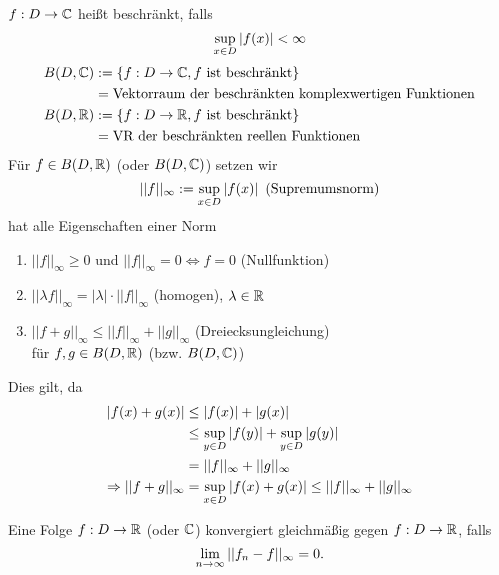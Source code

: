\documentclass[../ana1.tex]{subfiles}
\begin{document}
\begin{defi}
    \( f: D \rightarrow \mathbb{C} \) heißt beschränkt, falls 
    \[ \underset{x\in D}{\sup} \left|f(x)\right| < \infty \]
    \begin{align*}
        B(D, \mathbb{C}) &:= \{ f: D \rightarrow \mathbb{C}, 
        f \text{ ist beschränkt} \} \\
        &= \text{Vektorraum der beschränkten 
        komplexwertigen Funktionen} \\
        B(D, \mathbb{R}) &:= \{ f: D \rightarrow \mathbb{R}, 
        f \text{ ist beschränkt} \} \\
        &= \text{VR der beschränkten reellen Funktionen}
    \end{align*}
    Für \( f\in B(D,\mathbb{R}) \) (oder \( B(D,\mathbb{C}) \)) setzen wir 
    \[ ||f||_\infty := \underset{x\in D}{\sup} \left|f(x)\right| 
    \text{ (Supremumsnorm)} \]
    hat alle Eigenschaften einer Norm
    \begin{enumerate}
        \item \( ||f||_\infty \geq 0 \) und 
        \( ||f||_\infty = 0 \Leftrightarrow f = 0 \) 
        (Nullfunktion)
        \item \( ||\lambda f||_\infty = |\lambda| \cdot 
        ||f||_\infty \) (homogen), \( \lambda \in \mathbb{R} \)
        \item \( ||f+g||_\infty \leq ||f||_\infty 
        + ||g||_\infty \) (Dreiecksungleichung) \\
        für \( f, g \in B(D, \mathbb{R}) \) (bzw. \( B(D,\mathbb{C}) \))
    \end{enumerate}
    Dies gilt, da
    \begin{align*}
        \left| f(x) + g(x) \right| &\leq \left|f(x)\right| + \left|g(x)\right| \\
        &\leq \underset{y\in D}{\sup} \left| f(y) \right| 
        + \underset{y\in D}{\sup} \left|g(y)\right|\\
        &= ||f||_\infty + ||g||_\infty \\
        \Rightarrow ||f + g||_\infty &= \underset{x\in D}{\sup}
        \left|f(x) + g(x)\right| \leq ||f||_\infty + ||g||_\infty
    \end{align*}
\end{defi}
\begin{defi}
    Eine Folge \( f: D \rightarrow \mathbb{R} \) (oder \( \mathbb{C} \)) 
    konvergiert gleichmäßig gegen \( f: D \rightarrow \mathbb{R} \), 
    falls 
    \[ \lim\limits_{n\rightarrow\infty} ||f_n - f ||_\infty = 0. \]
\end{defi}
\end{document}
